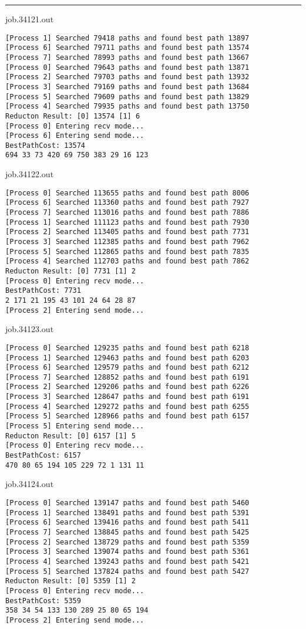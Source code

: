 \documentclass[letter, 12pt]{article}
\newenvironment{question}[1]{%
    \vspace{.2in}%
        \noindent{\bf #1}%
    \vspace{0.3em} \hrule \vspace{.1in}%
}{}
\begin{document}
\begin{question}{\large Appendix}
job.34121.out
\begin{lstlisting}[style=CStyle]
[Process 1] Searched 79418 paths and found best path 13897
[Process 6] Searched 79711 paths and found best path 13574
[Process 7] Searched 78993 paths and found best path 13667
[Process 0] Searched 79643 paths and found best path 13871
[Process 2] Searched 79703 paths and found best path 13932
[Process 3] Searched 79169 paths and found best path 13684
[Process 5] Searched 79609 paths and found best path 13829
[Process 4] Searched 79935 paths and found best path 13750
Reducton Result: [0] 13574 [1] 6
[Process 0] Entering recv mode...
[Process 6] Entering send mode...
BestPathCost: 13574
694 33 73 420 69 750 383 29 16 123 
\end{lstlisting}

job.34122.out
\begin{lstlisting}[style=CStyle]
[Process 0] Searched 113655 paths and found best path 8006
[Process 6] Searched 113360 paths and found best path 7927
[Process 7] Searched 113016 paths and found best path 7886
[Process 1] Searched 111123 paths and found best path 7930
[Process 2] Searched 113405 paths and found best path 7731
[Process 3] Searched 112385 paths and found best path 7962
[Process 5] Searched 112865 paths and found best path 7835
[Process 4] Searched 112703 paths and found best path 7862
Reducton Result: [0] 7731 [1] 2
[Process 0] Entering recv mode...
BestPathCost: 7731
2 171 21 195 43 101 24 64 28 87 
[Process 2] Entering send mode...
\end{lstlisting}

job.34123.out
\begin{lstlisting}[style=CStyle]
[Process 0] Searched 129235 paths and found best path 6218
[Process 1] Searched 129463 paths and found best path 6203
[Process 6] Searched 129579 paths and found best path 6212
[Process 7] Searched 128852 paths and found best path 6191
[Process 2] Searched 129206 paths and found best path 6226
[Process 3] Searched 128647 paths and found best path 6191
[Process 4] Searched 129272 paths and found best path 6255
[Process 5] Searched 128966 paths and found best path 6157
[Process 5] Entering send mode...
Reducton Result: [0] 6157 [1] 5
[Process 0] Entering recv mode...
BestPathCost: 6157
470 80 65 194 105 229 72 1 131 11 
\end{lstlisting}

job.34124.out
\begin{lstlisting}[style=CStyle]
[Process 0] Searched 139147 paths and found best path 5460
[Process 1] Searched 138491 paths and found best path 5391
[Process 6] Searched 139416 paths and found best path 5411
[Process 7] Searched 138845 paths and found best path 5425
[Process 2] Searched 138729 paths and found best path 5359
[Process 3] Searched 139074 paths and found best path 5361
[Process 4] Searched 139243 paths and found best path 5421
[Process 5] Searched 137824 paths and found best path 5427
Reducton Result: [0] 5359 [1] 2
[Process 0] Entering recv mode...
BestPathCost: 5359
358 34 54 133 130 289 25 80 65 194 
[Process 2] Entering send mode...
\end{lstlisting}


\end{question}
\end{document}
